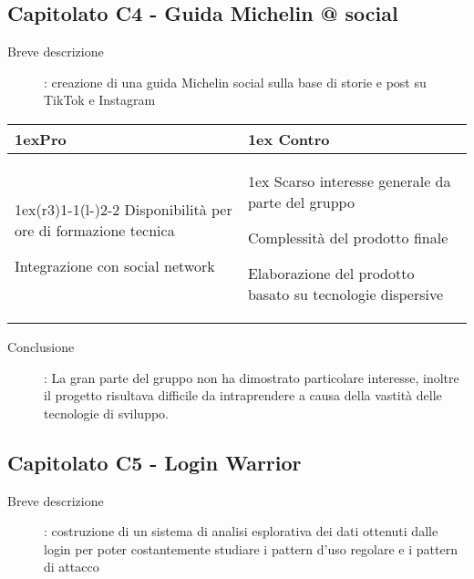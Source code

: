 \subsection{Capitolato C4 - Guida Michelin @ social}
\begin{description}
\item [Breve descrizione]: creazione di una guida Michelin social sulla base di storie e post su TikTok e Instagram
\end{description}
\begin{table}[h]
\begin{tabularx}{\linewidth}{>{\parskip1ex}X@{\kern4\tabcolsep}>{\parskip1ex}X}
\hfil\bfseries Pro
&
\hfil\bfseries Contro
\\\cmidrule(r{3\tabcolsep}){1-1}\cmidrule(l{-\tabcolsep}){2-2}
Disponibilità per ore di formazione tecnica \par
Integrazione con social network 
&
Scarso interesse generale da parte del gruppo \par
Complessità del prodotto finale	\par
Elaborazione del prodotto basato su tecnologie dispersive \\
\end{tabularx}
\end{table}
\begin{description}
	\item [Conclusione]: La gran parte del gruppo non ha dimostrato particolare interesse, inoltre il progetto risultava difficile da intraprendere a causa della vastità delle tecnologie di sviluppo.
\end{description}


\newpage

\subsection{Capitolato C5 - Login Warrior}
\begin{description}
\item [Breve descrizione]: costruzione di un sistema di analisi esplorativa dei dati ottenuti dalle login per poter costantemente studiare i pattern d’uso regolare e i pattern di attacco
\end{description}


